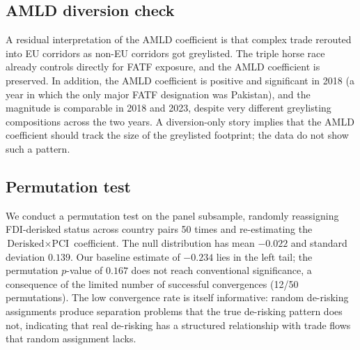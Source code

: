 \subsection{AMLD diversion check}

A residual interpretation of the AMLD coefficient is that complex trade rerouted into EU corridors as non-EU corridors got greylisted. The triple horse race already controls directly for FATF exposure, and the AMLD coefficient is preserved. In addition, the AMLD coefficient is positive and significant in 2018 (a year in which the only major FATF designation was Pakistan), and the magnitude is comparable in 2018 and 2023, despite very different greylisting compositions across the two years. A diversion-only story implies that the AMLD coefficient should track the size of the greylisted footprint; the data do not show such a pattern.

\subsection{Permutation test}

We conduct a permutation test on the panel subsample, randomly reassigning FDI-derisked status across country pairs 50 times and re-estimating the $\text{Derisked} \times \text{PCI}$ coefficient. The null distribution has mean $-0.022$ and standard deviation $0.139$. Our baseline estimate of $-0.234$ lies in the left tail; the permutation $p$-value of $0.167$ does not reach conventional significance, a consequence of the limited number of successful convergences (12/50 permutations). The low convergence rate is itself informative: random de-risking assignments produce separation problems that the true de-risking pattern does not, indicating that real de-risking has a structured relationship with trade flows that random assignment lacks.
